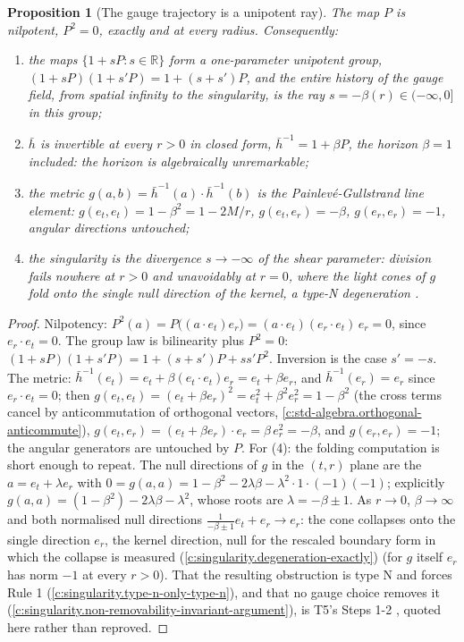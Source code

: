 \documentclass[11pt]{article}
\newtheorem{proposition}[theorem]{Proposition}
\theoremstyle{definition}
\theoremstyle{plain}
\providecommand{\R}{}\renewcommand{\R}{\mathbb{R}}
\providecommand{\er}{}\renewcommand{\er}{e_r}
\providecommand{\et}{}\renewcommand{\et}{e_t}
\providecommand{\hb}{}\renewcommand{\hb}{\bar{h}}
\begin{document}
\begin{proposition}[The gauge trajectory is a unipotent ray]\label{c:interior.gauge-trajectory-unipotent-ray}
The map $P$ is nilpotent, $P^2 = 0$, exactly and at every radius. Consequently:
\begin{enumerate}
\item the maps $\{1 + sP : s \in \R\}$ form a one-parameter unipotent group, $(1 + sP)(1 + s'P) = 1 + (s + s')P$, and the entire history of the gauge field, from spatial infinity to the singularity, is the ray $s = -\beta(r) \in (-\infty, 0]$ in this group;
\item $\hb$ is invertible at every $r > 0$ in closed form, $\hb^{-1} = 1 + \beta P$, the horizon $\beta = 1$ included: the horizon is algebraically unremarkable;
\item the metric $g(a,b) = \hb^{-1}(a)\cdot\hb^{-1}(b)$ is the Painlev\'e-Gullstrand line element: $g(\et,\et) = 1 - \beta^2 = 1 - 2M/r$, $g(\et,\er) = -\beta$, $g(\er,\er) = -1$, angular directions untouched;
\item the singularity is the divergence $s \to -\infty$ of the shear parameter: division fails nowhere at $r > 0$ and unavoidably at $r = 0$, where the light cones of $g$ fold onto the single null direction of the kernel, a type-N degeneration \cite[Props.~2.4-2.6, 3.1]{ButlerT5}.
\end{enumerate}
\end{proposition}
\begin{proof}
Nilpotency: $P^2(a) = P\bigl((a\cdot\et)\er\bigr) = (a\cdot\et)(\er\cdot\et)\,\er = 0$, since $\er \cdot \et = 0$. The group law is bilinearity plus $P^2 = 0$: $(1 + sP)(1 + s'P) = 1 + (s + s')P + ss'P^2$. Inversion is the case $s' = -s$. The metric: $\hb^{-1}(\et) = \et + \beta(\et\cdot\et)\er = \et + \beta\er$, and $\hb^{-1}(\er) = \er$ since $\er \cdot \et = 0$; then $g(\et,\et) = (\et + \beta\er)^2 = \et^2 + \beta^2\er^2 = 1 - \beta^2$ (the cross terms cancel by anticommutation of orthogonal vectors, \ref{c:std-algebra.orthogonal-anticommute}), $g(\et,\er) = (\et + \beta\er)\cdot\er = \beta\,\er^2 = -\beta$, and $g(\er,\er) = -1$; the angular generators are untouched by $P$. For (4): the folding computation is short enough to repeat. The null directions of $g$ in the $(t,r)$ plane are the $a = \et + \lambda\er$ with $0 = g(a,a) = 1 - \beta^2 - 2\lambda\beta - \lambda^2 \cdot 1 \cdot (-1)(-1)$; explicitly $g(a,a) = (1-\beta^2) - 2\lambda\beta - \lambda^2$, whose roots are $\lambda = -\beta \pm 1$. As $r \to 0$, $\beta \to \infty$ and both normalised null directions $\tfrac{1}{-\beta\pm1}\et + \er \to \er$: the cone collapses onto the single direction $\er$, the kernel direction, null for the rescaled boundary form in which the collapse is measured \cite[Prop.~2.6]{ButlerT5} (\ref{c:singularity.degeneration-exactly}) (for $g$ itself $\er$ has norm $-1$ at every $r > 0$). That the resulting obstruction is type N and forces Rule 1 (\ref{c:singularity.type-n-only-type-n}), and that no gauge choice removes it (\ref{c:singularity.non-removability-invariant-argument}), is T5's Steps 1-2 \cite{ButlerT5}, quoted here rather than reproved.

\end{proof}
\end{document}
